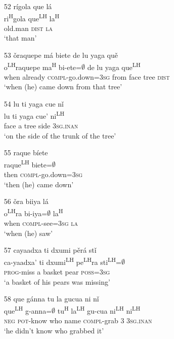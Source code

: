 \begin{itemize}
\item[52]
\glll r\'{i}gola que l\'{a}\\
ri\textsuperscript{H}gola que\textsuperscript{LH} la\textsuperscript{H}\\
old.man \textsc{dist} \textsc{la}\\
\glt `that man'


\item[53]
\glll \v{o}raquepe m\'{a} biete de lu yaga qu\v{e}\\
o\textsuperscript{LH}raquepe ma\textsuperscript{H} bi-ete=$\emptyset$ de lu yaga que\textsuperscript{LH}\\
when already \textsc{compl}-go.down=\textsc{3sg} from face tree \textsc{dist}\\
\glt `when (he) came down from that tree'


\item[54]
\glll lu ti yaga cue n\v{i}\\
lu ti yaga cue' ni\textsuperscript{LH}\\
face a tree side \textsc{3sg.inan}\\
\glt `on the side of the trunk of the tree'


\item[55]
\glll raque b\'{i}ete\\
raque\textsuperscript{LH}  biete=$\emptyset$\\
then \textsc{compl}-go.down=\textsc{3sg}\\
\glt `then (he) came down'


\item[56]
\glll \v{o}ra biiya l\'{a}\\
o\textsuperscript{LH}ra bi-iya=$\emptyset$ la\textsuperscript{H}\\
when \textsc{compl}-see=\textsc{3sg} \textsc{la}\\
\glt  `when (he) saw'


\item[57]
\glll cayaadxa ti dxumi p\v{e}r\'{a} st\v{i}\\
ca-yaadxa' ti dxumi\textsuperscript{LH} pe\textsuperscript{LH}ra sti\textsuperscript{LH}=$\emptyset$\\
\textsc{prog}-miss a basket pear \textsc{poss}=\textsc{3sg}\\
\glt  `a basket of his pears was missing'


\item[58]
\glll que g\'{a}nna tu la gucua ni n\v{i}\\
que\textsuperscript{LH} g-anna=$\emptyset$ tu\textsuperscript{H} la\textsuperscript{LH} gu-cua ni\textsuperscript{LH} ni\textsuperscript{LH}\\
\textsc{neg} \textsc{pot}-know who name \textsc{compl}-grab \textsc{3} \textsc{3sg.inan}\\
\glt `he didn't know who grabbed it'



\end{itemize}
